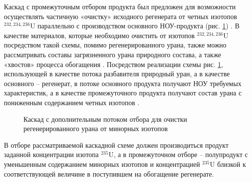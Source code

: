 Каскад с промежуточным отбором продукта был предложен для возможности осуществлять частичную «очистку» исходного регенерата от четных изотопов $^{232,234,236}$U параллельно с производством основного НОУ-продукта (рис. \ref{fig:3_out}) \cite{zhurinSPOSOBPERERABOTKIZAGRYaZNENNOGO, palkinAnaliticheskiyRaschetSoderzhaniya2007}. В качестве материалов, которые необходимо очистить от изотопов $^{232,234,236}$U посредством такой схемы, помимо регенерированного урана, также можно рассматривать составы загрязненного урана природного состава, а также «хвостов» процесса обогащения \cite{palkinSeparationUraniumIsotopes2010}. Посредством реализации схемы рис. \ref{fig:3_out}, использующей в качестве потока разбавителя природный уран, а в качестве основного -- регенерат, в потоке основного продукта получают НОУ требуемых характеристик, а в качестве промежуточного продукта получают состав урана с пониженным содержанием четных изотопов \cite{palkinSeparationUraniumIsotopes2010}.
\begin{figure}[ht]
  \caption{Каскад с дополнительным потоком отбора для очистки регенерированного урана от минорных изотопов}\label{fig:3_out}
\end{figure}

В отборе рассматриваемой каскадной схеме должен производиться продукт заданной концентрации изотопа $^{235}$U, а в промежуточном отборе -- полупродукт с уменьшенным содержанием минорных изотопов и концентрацией $^{235}$U близкой к соответствующей величине в поступившем на обогащение регенерате.

